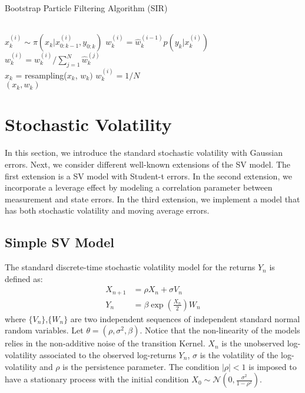 \documentclass[11pt,a4,twosided,singlespacing,titlepagenumber=on]{scrreprt}
\numberwithin{equation}{chapter} %
\theoremstyle{remark}
\begin{document}
\begin{algorithm}
\caption{Bootstrap Particle Filtering Algorithm (SIR)}\label{euclid}
\begin{algorithmic}[1]
\Procedure{}{}
\\
	\State $x_k^{(i)} \sim \pi(x_k | x_{0:k-1}^{(i)}, y_{0:k})$
	\State $w_k^{(i)} = \hat{w}_k^{(i-1)} p(y_k | x_k^{(i)})$
\\
	\State $w_k^{(i)} = \hat{w}_k^{(i)} / \sum_{j=1}^N \hat{w}_k^{(j)} $
\\
\State $x_k$ = resampling($x_k$, $w_k)$
	\State $w_k^{(i)} = 1 / N$
\\
\EndProcedure
\Return $(x_k, w_k)$

\end{algorithmic}
\end{algorithm}

\newpage
\section{Stochastic Volatility}
In this section, we introduce the standard stochastic volatility with Gaussian errors. Next, we consider different well-known extensions of the SV model. The first extension is a SV model with Student-t errors. In the second extension, we incorporate a leverage effect by modeling a correlation parameter between measurement and state errors. In the third extension, we implement a model that has both stochastic volatility and moving average errors.

\subsection{Simple SV Model}
The standard discrete-time stochastic volatility model for the returns $Y_n$ is defined as:
\begin{align*}
  X_{n+1} &=  \rho X_{n} + \sigma V_n \\
  Y_n &=  \beta \exp \left( \frac{X_n}{2} \right) W_n
\end{align*}
where  $\{V_n\}$,$\{W_n\}$ are two independent sequences of independent standard normal random variables. Let $\theta = (\rho, \sigma^2, \beta)$. Notice that the non-linearity of the models relies in the non-additive noise of the transition Kernel. $X_n$ is the unobserved log-volatility associated to the observed log-returns $Y_n$, $\sigma$ is the volatility of the log-volatility and $\rho$ is the persistence parameter. The condition $|\rho| < 1$  is imposed to have a stationary process with the initial condition $X_0 \sim \mathcal{N} \left(0, \frac{\sigma^2}{1-\rho^2} \right)$.
\end{document}
